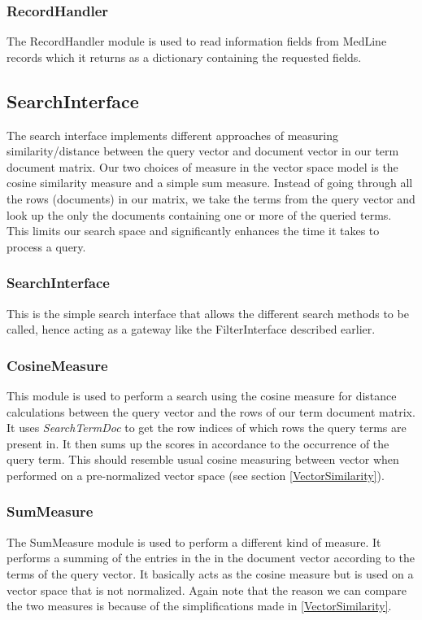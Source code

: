 \subsubsection{RecordHandler}
The RecordHandler module is used to read information fields from
MedLine records which it returns as a dictionary containing the
requested fields.

\subsection{SearchInterface}
The search interface implements different approaches of measuring
similarity/distance between the query vector and document vector in
our term document matrix. Our two choices of measure in the vector
space model is the cosine similarity measure and a simple sum
measure. Instead of going through all the rows (documents) in our
matrix, we take the terms from the query vector and look up the only
the documents containing one or more of the queried terms. This limits
our search space and significantly enhances the time it takes to
process a query.

\subsubsection{SearchInterface}
This is the simple search interface that allows the different search
methods to be called, hence acting as a gateway like the
FilterInterface described earlier.

\subsubsection{CosineMeasure}
This module is used to perform a search using the cosine measure for
distance calculations between the query vector and the rows of our
term document matrix. It uses \textit{SearchTermDoc} to get the row
indices of which rows the query terms are present in. It then sums up
the scores in accordance to the occurrence of the query term. This
should resemble usual cosine measuring between vector when performed
on a pre-normalized vector space (see section \ref{VectorSimilarity}).

\subsubsection{SumMeasure}
The SumMeasure module is used to perform a different kind of
measure. It performs a summing of the entries in the in the document
vector according to the terms of the query vector. It basically acts
as the cosine measure but is used on a vector space that is not
normalized. Again note that the reason we can compare the two measures
is because of the simplifications made in \ref{VectorSimilarity}.

